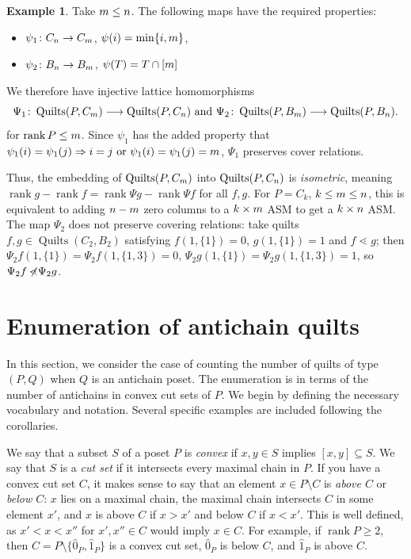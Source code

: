 \documentclass[12pt]{amsart}
\numberwithin{equation}{section}
\theoremstyle{definition}
\newtheorem{example}[theorem]{Example}
\newcommand{\longto}{\longrightarrow}
\newcommand{\quilt}{\operatorname{Quilts}}
\newcommand{\rank}{\operatorname{rank}}
\begin{document}
\begin{example}
 Take $m \leq n$. The following maps have the required
properties: \begin{itemize} \item $\psi_1 \colon C_n \to C_m$,
$\psi(i) = \min\{i,m\}$, \item $\psi_2 \colon B_n \to B_m$,
$\psi(T) = T \cap [m]$ \end{itemize} We therefore have injective
lattice homomorphisms $$\Psi_1 \colon \quilt(P, C_\mn) \longto
\quilt(P, C_\mm) \mbox{ and } \Psi_2 \colon \quilt(P, B_\mn) \longto
\quilt(P, B_\mm).$$ for $\rank P \leq \mn$. Since $\psi_1$ has the
added property that $\psi_1(i) = \psi_1(j) \Rightarrow i = j \mbox{ or
} \psi_1(i) = \psi_1(j) = m$, $\Psi_1$ preserves cover relations.

Thus, the embedding of $\quilt(P, C_\mn)$ into $\quilt(P, C_\mm)$ is
\textit{isometric}, meaning $\rank g - \rank f = \rank \Psi g - \rank
\Psi f$ for all $f,g$. For $P = C_k$, $k \leq m \leq n$, this is equivalent to
 adding $n-m$ zero columns to a $k \times m$ ASM to get a $k
 \times n$ ASM. The map $\Psi_2$ does not preserve covering relations: take quilts $f,g \in \quilt(C_2,B_2)$ satisfying $f(1,\{1\}) = 0$, $g(1,\{1\}) = 1$ and $f \lessdot g$; then $\Psi_2 f(1,\{1\}) = \Psi_2 f(1,\{1,3\}) =0$, $\Psi_2 g(1,\{1\}) = \Psi_2 g(1,\{1,3\}) = 1$, so $\Psi_2 f \not\!\!\lessdot \Psi_2 g$.
\end{example}


\section{Enumeration of antichain quilts} \label{sec:antichain}


In this section, we consider the case of counting the number of quilts
of type $(P,Q)$ when $Q$ is an antichain poset.  The enumeration is in
terms of the number of antichains in convex cut sets of $P$.  We begin
by defining the necessary vocabulary and notation.  Several specific
examples are included following the corollaries.


We say that a subset $S$ of a poset $P$ is \emph{convex} if $x,y \in S$
implies $[x,y] \subseteq S$. We say that $S$ is a \emph{cut set} if it
intersects every maximal chain in $P$. If
you have a convex cut set $C$, it makes sense to say that an element
$x \in P \setminus C$ is \emph{above $C$} or \emph{below $C$}: $x$
lies on a maximal chain, the maximal chain intersects $C$ in some
element $x'$, and $x$ is above $C$ if $x > x'$ and below $C$ if $x <
x'$. This is well defined, as $x' < x < x''$ for $x',x'' \in C$ would
imply $x \in C$. For example, if $\rank P \geq 2$, then $C=P \setminus
\{\hat 0_P, \hat 1_P\}$ is a convex cut set, $\hat 0_P$ is below $C$,
and $\hat 1_P$ is above $C$.
\end{document}
